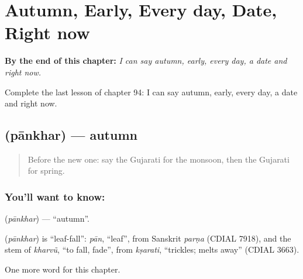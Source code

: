 
\chapter{Autumn, Early, Every day, Date, Right now}
\label{ch:gu-autumn-early-every-day-date-right-now}

\begin{chapteropening}
\textbf{By the end of this chapter:} \emph{I can say autumn, early, every day, a date and right now.}

Complete the last lesson of chapter 94: I can say autumn, early, every day, a date and right now.
\end{chapteropening}

\section[\texorpdfstring{\gu{પાનખર} (pānkhar)}{પાનખર (pānkhar)}]{ (pānkhar) — autumn}

\label{lesson:GU-C94-pankhar}



\begin{quote}
Before the new one: say the Gujarati for the monsoon, then the Gujarati for spring.
\end{quote}

\subsection*{You'll want to know: }
\textbf{} (\emph{pānkhar}) — \textquotedblleft{}autumn\textquotedblright{}.

\begin{cousinweb}
\textbf{} (\emph{pānkhar}) is \textquotedblleft{}leaf-fall\textquotedblright{}: \emph{pān}, \textquotedblleft{}leaf\textquotedblright{}, from Sanskrit \emph{parṇa} (CDIAL 7918), and the stem of \emph{kharvũ}, \textquotedblleft{}to fall, fade\textquotedblright{}, from \emph{kṣarati}, \textquotedblleft{}trickles; melts away\textquotedblright{} (CDIAL 3663).
\end{cousinweb}

\begin{grammarlens}[title={What you've built}]
One more word for this chapter.
\end{grammarlens}

